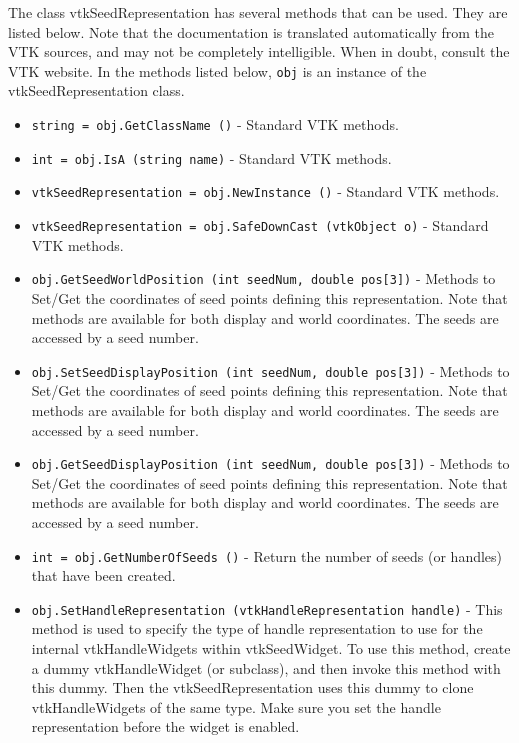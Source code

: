 The class vtkSeedRepresentation has several methods that can be used.
  They are listed below.
Note that the documentation is translated automatically from the VTK sources,
and may not be completely intelligible.  When in doubt, consult the VTK website.
In the methods listed below, \verb|obj| is an instance of the vtkSeedRepresentation class.
\begin{itemize}
\item  \verb|string = obj.GetClassName ()| -  Standard VTK methods.

\item  \verb|int = obj.IsA (string name)| -  Standard VTK methods.

\item  \verb|vtkSeedRepresentation = obj.NewInstance ()| -  Standard VTK methods.

\item  \verb|vtkSeedRepresentation = obj.SafeDownCast (vtkObject o)| -  Standard VTK methods.

\item  \verb|obj.GetSeedWorldPosition (int seedNum, double pos[3])| -  Methods to Set/Get the coordinates of seed points defining
 this representation. Note that methods are available for both
 display and world coordinates. The seeds are accessed by a seed
 number.

\item  \verb|obj.SetSeedDisplayPosition (int seedNum, double pos[3])| -  Methods to Set/Get the coordinates of seed points defining
 this representation. Note that methods are available for both
 display and world coordinates. The seeds are accessed by a seed
 number.

\item  \verb|obj.GetSeedDisplayPosition (int seedNum, double pos[3])| -  Methods to Set/Get the coordinates of seed points defining
 this representation. Note that methods are available for both
 display and world coordinates. The seeds are accessed by a seed
 number.

\item  \verb|int = obj.GetNumberOfSeeds ()| -  Return the number of seeds (or handles) that have been created.

\item  \verb|obj.SetHandleRepresentation (vtkHandleRepresentation handle)| -  This method is used to specify the type of handle representation to use
 for the internal vtkHandleWidgets within vtkSeedWidget.  To use this
 method, create a dummy vtkHandleWidget (or subclass), and then invoke
 this method with this dummy. Then the vtkSeedRepresentation uses this
 dummy to clone vtkHandleWidgets of the same type. Make sure you set the
 handle representation before the widget is enabled. 


\end{itemize}
